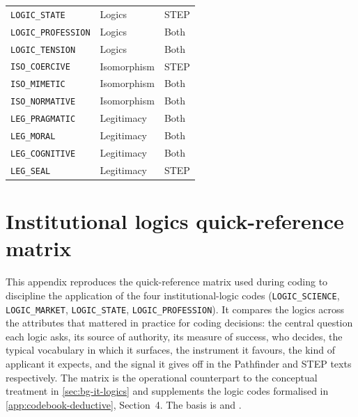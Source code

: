 \begin{longtable}{@{} l l l @{}}
\texttt{LOGIC\_STATE} & Logics & STEP \\
\texttt{LOGIC\_PROFESSION} & Logics & Both \\
\texttt{LOGIC\_TENSION} & Logics & Both \\
\texttt{ISO\_COERCIVE} & Isomorphism & STEP \\
\texttt{ISO\_MIMETIC} & Isomorphism & Both \\
\texttt{ISO\_NORMATIVE} & Isomorphism & Both \\
\texttt{LEG\_PRAGMATIC} & Legitimacy & Both \\
\texttt{LEG\_MORAL} & Legitimacy & Both \\
\texttt{LEG\_COGNITIVE} & Legitimacy & Both \\
\texttt{LEG\_SEAL} & Legitimacy & STEP \\
\end{longtable}

\chapter{Institutional logics quick-reference matrix}
\label{app:logics-matrix}

This appendix reproduces the quick-reference matrix used during coding
to discipline the application of the four institutional-logic codes
(\texttt{LOGIC\_SCIENCE}, \texttt{LOGIC\_MARKET}, \texttt{LOGIC\_STATE},
\texttt{LOGIC\_PROFESSION}). It compares the logics across the
attributes that mattered in practice for coding decisions: the central
question each logic asks, its source of authority, its measure of
success, who decides, the typical vocabulary in which it surfaces, the
instrument it favours, the kind of applicant it expects, and the
signal it gives off in the Pathfinder and STEP texts respectively. The
matrix is the operational counterpart to the conceptual treatment in
\cref{sec:bg-it-logics} and supplements the logic codes formalised in
\cref{app:codebook-deductive}, Section~4. The basis is
\textcite{friedland1991bringing} and \textcite{thornton2012institutional}.

